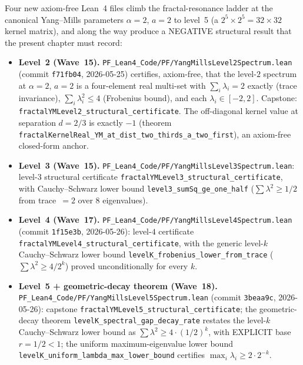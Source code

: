 \begin{remark}\label{rem:ym-wave16-18-lean}
Four new axiom-free Lean~4 files climb the fractal-resonance ladder at the canonical Yang--Mills parameters $\alpha = 2$, $a = 2$ to level~5 (a $2^5 \times 2^5 = 32 \times 32$ kernel matrix), and along the way produce a NEGATIVE structural result that the present chapter must record:
\begin{itemize}
  \item \textbf{Level~2 (Wave~15).} \texttt{PF\_Lean4\_Code/PF/YangMillsLevel2Spectrum.lean} (commit \texttt{f71fb04}, 2026-05-25) certifies, axiom-free, that the level-$2$ spectrum at $\alpha = 2$, $a = 2$ is a four-element real multi-set with $\sum_i \lambda_i = 2$ exactly (trace invariance), $\sum_i \lambda_i^2 \leq 4$ (Frobenius bound), and each $\lambda_i \in [-2, 2]$. Capstone: \texttt{fractalYMLevel2\_structural\_certificate}. The off-diagonal kernel value at separation $d = 2/3$ is exactly $-1$ (theorem \texttt{fractalKernelReal\_YM\_at\_dist\_two\_thirds\_a\_two\_first}), an axiom-free closed-form anchor.
  \item \textbf{Level~3 (Wave~15).} \texttt{PF\_Lean4\_Code/PF/YangMillsLevel3Spectrum.lean}: level-$3$ structural certificate \texttt{fractalYMLevel3\_structural\_certificate}, with Cauchy--Schwarz lower bound \texttt{level3\_sumSq\_ge\_one\_half} ($\sum \lambda^2 \geq 1/2$ from trace~$=2$ over 8 eigenvalues).
  \item \textbf{Level~4 (Wave~17).} \texttt{PF\_Lean4\_Code/PF/YangMillsLevel4Spectrum.lean} (commit \texttt{1f15e3b}, 2026-05-26): level-$4$ certificate \texttt{fractalYMLevel4\_structural\_certificate}, with the generic level-$k$ Cauchy--Schwarz lower bound \texttt{levelK\_frobenius\_lower\_from\_trace} ($\sum \lambda^2 \geq 4/2^k$) proved unconditionally for every $k$.
  \item \textbf{Level~5 + geometric-decay theorem (Wave~18).} \texttt{PF\_Lean4\_Code/PF/YangMillsLevel5Spectrum.lean} (commit \texttt{3beaa9c}, 2026-05-26): capstone \texttt{fractalYMLevel5\_structural\_certificate}; the geometric-decay theorem \texttt{levelK\_spectral\_gap\_decay\_rate} restates the level-$k$ Cauchy--Schwarz lower bound as $\sum \lambda^2 \geq 4 \cdot (1/2)^k$, with EXPLICIT base $r = 1/2 < 1$; the uniform maximum-eigenvalue lower bound \texttt{levelK\_uniform\_lambda\_max\_lower\_bound} certifies $\max_i \lambda_i \geq 2 \cdot 2^{-k}$.
\end{itemize}


\end{remark}
